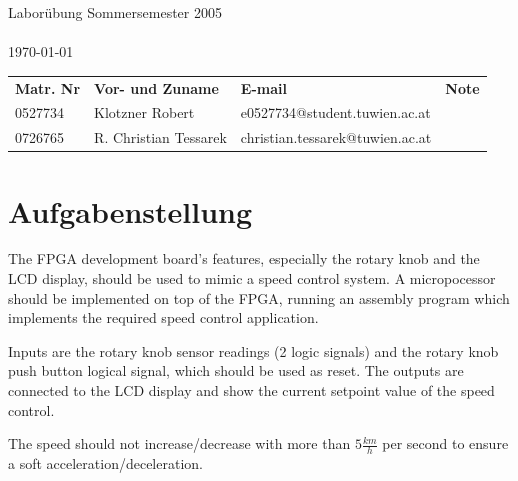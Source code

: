 \documentclass[a4paper,10pt]{scrartcl}
\begin{document}
\begin{titlepage}
\begin{center}
\begin{Large}

\sffamily \vspace*{\fill}{Institut f\"ur Computertechnik\\
Labor integrierte Schaltungen\\
384.088\\}
\vfill { Labor\"ubung Sommersemester 2005\\}
\vspace{10mm}{Betreuer: Dipl.-Ing. Herr Nachtnebel}\\
\today\\
\end{Large}
\vfill

\begin{tabular}{llll}
\textbf{Matr. Nr} & \textbf{Vor- und Zuname} & \textbf{E-mail} & \textbf{Note} \\
0527734 & Klotzner Robert & e0527734@student.tuwien.ac.at &  \\
0726765 & R. Christian Tessarek & christian.tessarek@tuwien.ac.at &
\end{tabular}

\end{center}
\end{titlepage}



\pagebreak
\tableofcontents
\pagebreak


\section{Aufgabenstellung}
\label{sec:aufgabe}

The FPGA development board's features, especially the rotary knob and the LCD display, should be used to mimic a speed control system. 
A micropocessor should be implemented on top of the FPGA, running an assembly program which implements the required speed control application. 

Inputs are the rotary knob sensor readings (2 logic signals) and the rotary knob push button logical signal, which should be used as reset. 
The outputs are connected to the LCD display and show the current setpoint value of the speed control. 

The speed should not increase/decrease with more than $5 \frac{km}{h}$ per second to ensure a soft acceleration/deceleration. 
\end{document}
